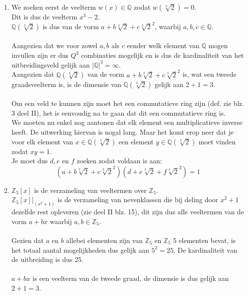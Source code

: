 \documentclass[11pt,a4paper,titlepage]{article}
\begin{document}
\begin{enumerate}[label=(\alph*)]
	\item We zoeken eerst de veelterm $w(x) \in \mathbb{Q}$ zodat $w(\sqrt[3]{2}) = 0$.\\ Dit is dus de veelterm $x^3-2$. \\
		$\mathbb{Q}(\sqrt[3]{2})$ is dus van de vorm $a + b \sqrt[3]{2} + c \sqrt[3]{2}^2$, waarbij $a,b,c \in \mathbb{Q}$.\\ \\
		Aangezien dat we voor zowel $a,b$ als $c$ eender welk element van $\mathbb{Q}$ mogen invullen zijn er dus $Q^3$ combinaties mogelijk en is dus de kardinaliteit van het uitbreidingsveld gelijk aan $|\mathbb{Q}|^3 = \infty$.\\
		Aangezien dat $\mathbb{Q}(\sqrt[3]{2})$ van de vorm $a + b \sqrt[3]{2} + c \sqrt[3]{2}^2$ is, wat een tweede graadsveelterm is, is de dimensie van $\mathbb{Q}(\sqrt[3]{2})$ gelijk aan $2+1 = 3$. \\ \\
		Om een veld te kunnen zijn moet het een commutatieve ring zijn (def. zie blz. 3 deel II), het is eenvoudig na te gaan dat dit een commutatieve ring is.\\
		We moeten nu enkel nog aantonen dat elk element een multiplicatieve inverse heeft. De uitwerking hiervan is nogal lang. Maar het komt erop neer dat je voor elk element van $x \in \mathbb{Q}(\sqrt[3]{2})$ een element $y \in \mathbb{Q}(\sqrt[3]{2})$ moet vinden zodat $xy = 1$.\\ Je moet dus $d,e$ en $f$ zoeken zodat voldaan is aan:
		$$(a + b \sqrt[3]{2} + c \sqrt[3]{2}^2)(d + e \sqrt[3]{2} + f \sqrt[3]{2}^2) = 1$$
	\item $\mathbb{Z}_5[x]$ is de verzameling van veeltermen over $\mathbb{Z}_5$.\\ $\mathbb{Z}_5[x]|_{(x^2+1)}$ is de verzameling van nevenklassen die bij deling door $x^2+1$ dezelfde rest opleveren (zie deel II blz. 15), dit zijn dus alle veeltermen van de vorm $a + bx$ waarbij $a,b \in \mathbb{Z}_5$. \\ \\
		Gezien dat $a$ en $b$ allebei elementen zijn van $\mathbb{Z}_5$ en $\mathbb{Z}_5$ 5 elementen bevat, is het totaal aantal mogelijkheden dus gelijk aan $5^2 = 25$. De kardinaliteit van de uitbreiding is dus 25.\\ \\
		$a + bx$ is een veelterm van de tweede graad, de dimensie is dus gelijk aan $2 + 1 = 3$. \\ \\

\end{enumerate}
\end{document}
